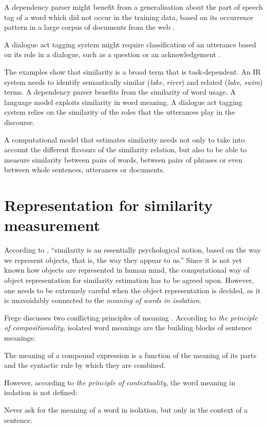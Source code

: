 A dependency parser might benefit from a generalisation about the part of speech tag of a word which did not occur in the training data, based on its occurrence pattern in a large corpus of documents from the web \cite{hermann-blunsom:2013:ACL2013,andreas-klein:2014:P14-2}.

A dialogue act tagging system might require classification of an utterance based on its role in a dialogue, such as a question or an acknowledgement \cite{kalchbrenner-blunsom:2013:CVSC}.

The examples show that similarity is a broad term that is task-dependent. An IR system needs to identify semantically similar (\textit{lake}, \textit{river}) and related (\textit{lake}, \textit{swim}) terms. A dependency parser benefits from the similarity of word usage. A language model exploits similarity in word meaning. A dialogue act tagging system relies on the similarity of the roles that the utterances play in the discourse.

A computational model that estimates similarity needs not only to take into account the different flavours of the similarity relation, but also to be able to measure similarity between pairs of words, between pairs of phrases or even between whole sentences, utterances or documents.

\section{Representation for similarity measurement}
\label{sec:word-meaning}

According to , ``similarity is an essentially psychological notion, based on the way we represent objects, that is, the way they appear to us.'' Since it is not yet known how objects are represented in human mind, the computational way of object representation for similarity estimation has to be agreed upon. However, one needs to be extremely careful when the object representation is decided, as it is unavoidably connected to the \emph{meaning of words in isolation}.


Frege discusses two conflicting principles of meaning \cite{Janssen2001}. According to \emph{the principle of compositionality}, isolated word meanings are the building blocks of sentence meanings:
\begin{displayquote}
The meaning of a compound expression is a function of the meaning of its parts and the syntactic rule by which they are combined.
\end{displayquote}
%
However, according to \emph{the principle of contextuality}, the word meaning in isolation is not defined:
\begin{displayquote}
Never ask for the meaning of a word in isolation, but only in the context of a sentence.
\end{displayquote}

